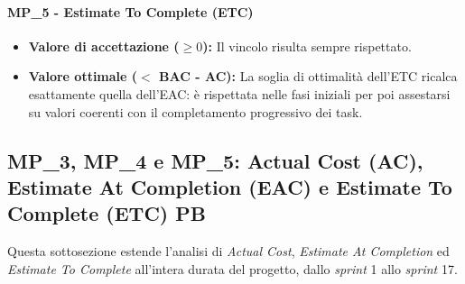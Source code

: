 \documentclass[12pt, a4paper]{article}
\begin{document}
\paragraph*{MP\_5 - Estimate To Complete (ETC)}
\begin{itemize}
    \item \textbf{Valore di accettazione ($\ge 0$):} Il vincolo risulta sempre rispettato.
    \item \textbf{Valore ottimale ($<$ BAC - AC):} La soglia di ottimalità dell'ETC ricalca esattamente quella dell'EAC: è rispettata nelle fasi iniziali per poi assestarsi su valori coerenti con il completamento progressivo dei task.
\end{itemize}

\subsection{MP\_3, MP\_4 e MP\_5:  Actual Cost (AC), Estimate At Completion (EAC) e Estimate To Complete (ETC) PB}
Questa sottosezione estende l'analisi di \textit{Actual Cost}, \textit{Estimate At Completion} ed \textit{Estimate To Complete} all'intera durata del progetto, dallo \textit{sprint} 1 allo \textit{sprint} 17.
\end{document}
